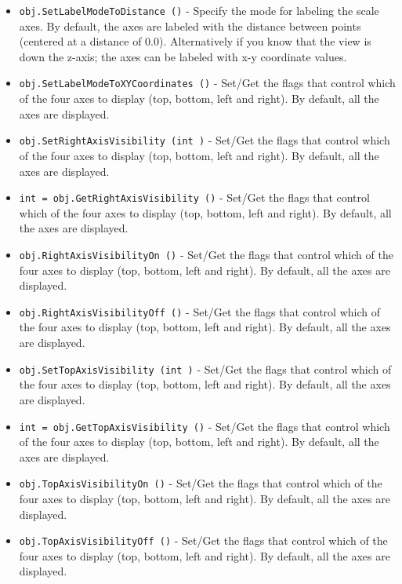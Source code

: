 \begin{itemize}
\item  \verb|obj.SetLabelModeToDistance ()| -  Specify the mode for labeling the scale axes. By default, the axes are
 labeled with the distance between points (centered at a distance of
 0.0). Alternatively if you know that the view is down the z-axis; the
 axes can be labeled with x-y coordinate values.

\item  \verb|obj.SetLabelModeToXYCoordinates ()| -  Set/Get the flags that control which of the four axes to display (top,
 bottom, left and right). By default, all the axes are displayed.

\item  \verb|obj.SetRightAxisVisibility (int )| -  Set/Get the flags that control which of the four axes to display (top,
 bottom, left and right). By default, all the axes are displayed.

\item  \verb|int = obj.GetRightAxisVisibility ()| -  Set/Get the flags that control which of the four axes to display (top,
 bottom, left and right). By default, all the axes are displayed.

\item  \verb|obj.RightAxisVisibilityOn ()| -  Set/Get the flags that control which of the four axes to display (top,
 bottom, left and right). By default, all the axes are displayed.

\item  \verb|obj.RightAxisVisibilityOff ()| -  Set/Get the flags that control which of the four axes to display (top,
 bottom, left and right). By default, all the axes are displayed.

\item  \verb|obj.SetTopAxisVisibility (int )| -  Set/Get the flags that control which of the four axes to display (top,
 bottom, left and right). By default, all the axes are displayed.

\item  \verb|int = obj.GetTopAxisVisibility ()| -  Set/Get the flags that control which of the four axes to display (top,
 bottom, left and right). By default, all the axes are displayed.

\item  \verb|obj.TopAxisVisibilityOn ()| -  Set/Get the flags that control which of the four axes to display (top,
 bottom, left and right). By default, all the axes are displayed.

\item  \verb|obj.TopAxisVisibilityOff ()| -  Set/Get the flags that control which of the four axes to display (top,
 bottom, left and right). By default, all the axes are displayed.


\end{itemize}
